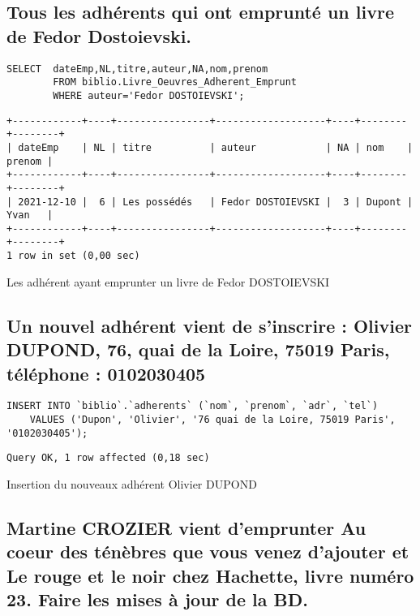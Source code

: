 \documentclass{article}
\begin{document}
\subsection{Tous les adhérents qui ont emprunté un livre de Fedor Dostoievski.}
\begin{listing}[H]
	\begin{verbatim}
SELECT	dateEmp,NL,titre,auteur,NA,nom,prenom 
		FROM biblio.Livre_Oeuvres_Adherent_Emprunt 
		WHERE auteur='Fedor DOSTOIEVSKI';
\end{verbatim}
	\begin{verbatim}
+------------+----+----------------+-------------------+----+--------+--------+
| dateEmp    | NL | titre          | auteur            | NA | nom    | prenom |
+------------+----+----------------+-------------------+----+--------+--------+
| 2021-12-10 |  6 | Les possédés   | Fedor DOSTOIEVSKI |  3 | Dupont | Yvan   |
+------------+----+----------------+-------------------+----+--------+--------+
1 row in set (0,00 sec)
\end{verbatim}
	\caption{Les adhérent ayant emprunter un livre de Fedor DOSTOIEVSKI}
\end{listing}

\subsection{ Un nouvel adhérent vient de s’inscrire : Olivier DUPOND, 76, quai de la Loire,
	75019 Paris, téléphone : 0102030405}

\begin{listing}[H]
	\begin{verbatim}
INSERT INTO `biblio`.`adherents` (`nom`, `prenom`, `adr`, `tel`) 
	VALUES ('Dupon', 'Olivier', '76 quai de la Loire, 75019 Paris', '0102030405');
\end{verbatim}
	\begin{verbatim}
Query OK, 1 row affected (0,18 sec)
\end{verbatim}
	\caption{Insertion du nouveaux adhérent Olivier DUPOND}
\end{listing}

\subsection{Martine CROZIER vient d’emprunter \og Au coeur des ténèbres\fg{} que vous venez
	d’ajouter et \og{}Le rouge et le noir\fg{} chez Hachette, livre numéro 23. Faire les mises à jour de la BD.}
\end{document}
